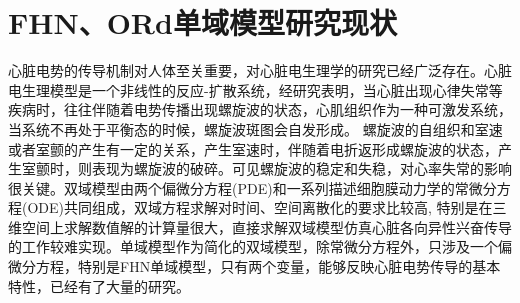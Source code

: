 \documentclass[twoside,UTF8]{nputhesis}
\begin{document}
\section{FHN、ORd单域模型研究现状}
心脏电势的传导机制对人体至关重要，对心脏电生理学的研究已经广泛存在。心脏电生理模型是一个非线性的反应-扩散系统，经研究表明，当心脏出现心律失常等疾病时，往往伴随着电势传播出现螺旋波的状态，心肌组织作为一种可激发系统，当系统不再处于平衡态的时候，螺旋波斑图会自发形成。
螺旋波的自组织和室速或者室颤的产生有一定的关系\cite{sprial2006}，产生室速时，伴随着电折返形成螺旋波的状态，产生室颤时，则表现为螺旋波的破碎。可见螺旋波的稳定和失稳，对心率失常的影响很关键。双域模型由两个偏微分方程(PDE)和一系列描述细胞膜动力学的常微分方程(ODE)共同组成，双域方程求解对时间、空间离散化的要求比较高, 特别是在三维空间上求解数值解的计算量很大\cite{Clayton2008}，直接求解双域模型仿真心脏各向异性兴奋传导的工作较难实现。单域模型作为简化的双域模型，除常微分方程外，只涉及一个偏微分方程，特别是FHN单域模型，只有两个变量，能够反映心脏电势传导的基本特性，已经有了大量的研究。
\end{document}
